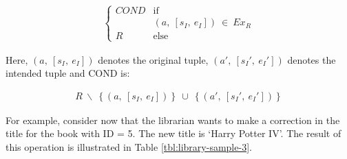 \begin{align}
							\begin{cases}
							COND & \text{if } \nonumber \\
							& \left(a,\ \left[s_{I},\ e_{I}\right]\right)\ \in\ Ex_{R}\\							
							R & \text{else }
							\end{cases}
							\nonumber
\end{align}

Here, $\left(a,\ \left[s_{I},\ e_{I}\right]\right)$ denotes the original tuple, $\left(a',\ \left[s_{I}',\ e_{I}'\right]\right)$ denotes the intended tuple and COND is:

\begin{align}
R\ \backslash\ \left\{\left(a,\ \left[s_{I},\ e_{I}\right]\right)\right\}\ \cup\ \left\{\left(a',\ \left[s_{I}',\ e_{I}'\right]\right)\right\} \nonumber
\end{align}


For example, consider now that the librarian wants to make a correction in the title for the book with ID = 5. The new title is `Harry Potter IV'. The result of this operation is illustrated in Table \ref{tbl:library-sample-3}.




